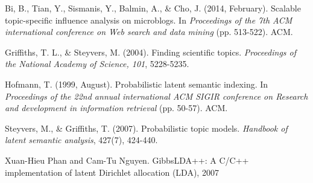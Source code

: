 \documentclass[a4paper]{article}
\begin{document}

\begin{thebibliography}{9}
Bi, B., Tian, Y., Sismanis, Y., Balmin, A., \& Cho, J. (2014, February). Scalable topic-specific influence analysis on microblogs. In \textit{Proceedings of the 7th ACM international conference on Web search and data mining} (pp. 513-522). ACM.

Griffiths, T. L., \& Steyvers, M. (2004). Finding scientific topics. \textit{Proceedings of the National Academy of Science, 101}, 5228-5235.

Hofmann, T. (1999, August). Probabilistic latent semantic indexing. In \textit{Proceedings of the 22nd annual international ACM SIGIR conference on Research and development in information retrieval} (pp. 50-57). ACM.

Steyvers, M., \& Griffiths, T. (2007). Probabilistic topic models. \textit{Handbook of latent semantic analysis}, 427(7), 424-440.

Xuan-Hieu Phan and Cam-Tu Nguyen. GibbsLDA++: A C/C++ implementation of latent Dirichlet allocation (LDA), 2007

\end{thebibliography}
\end{document}
